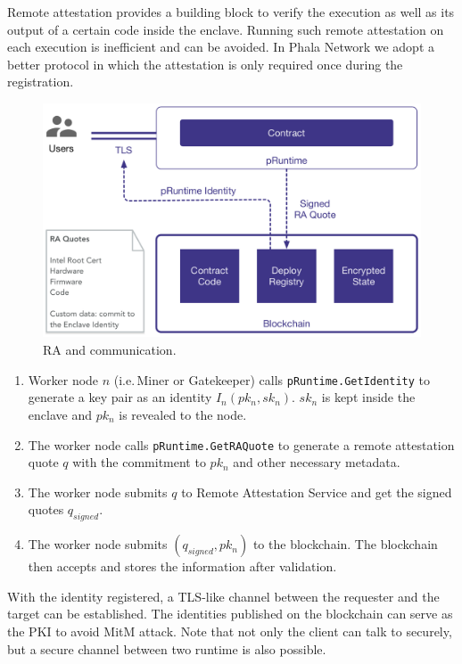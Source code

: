 Remote attestation provides a building block to verify the execution as well as its output of a certain code inside the enclave. Running such remote attestation on each execution is inefficient and can be avoided. In Phala Network we adopt a better protocol in which the attestation is only required once during the registration.

\begin{figure}
    \centering \footnotesize
    \includegraphics[width=.7\columnwidth]{img/pLIBRA-communication}
    \caption{RA and communication. }
    \label{fig:communication}
\end{figure}

\begin{enumerate}
    \item Worker node $n$ (i.e.\,Miner or Gatekeeper) calls \texttt{pRuntime.GetIdentity} to generate a key pair as an identity $I_n(pk_n, sk_n)$.  $sk_n$ is kept inside the enclave and $pk_n$ is revealed to the node.

    \item The worker node calls \texttt{pRuntime.GetRAQuote} to generate a remote attestation quote $q$ with the commitment to $pk_n$ and other necessary metadata.

    \item The worker node submits $q$ to Remote Attestation Service and get the signed quotes $q_{signed}$.

    \item The worker node submits $(q_{signed}, pk_n)$ to the blockchain. The blockchain then accepts and stores the information after validation.
\end{enumerate}

With the identity registered, a TLS-like channel between the requester and the target \pruntime can be established. The identities published on the blockchain can serve as the PKI to avoid MitM attack. Note that not only the client can talk to \pruntime securely, but a secure channel between two runtime is also possible.

